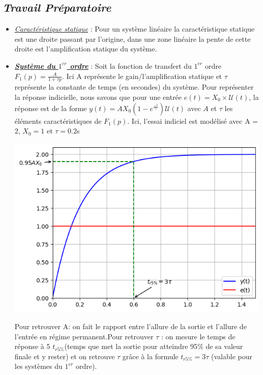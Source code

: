 \documentclass[12pt]{article}
\begin{document}
    \subsection{\itshape Travail Préparatoire}
\begin{itemize}
    

    \item  \underline{\itshape Caractéristique statique} : Pour un système linéaire la caractéristique statique est une
    droite passant par l'origine, dans une zone linéaire la pente de cette droite est
    l'amplification statique du système.

    \item \underline{\bf \itshape Système du $1^{er}$ ordre} : Soit la fonction de transfert du $1^{er}$ ordre $F_1(p) = \frac{A}{1 + \tau p }$. Ici A représente le gain/l'amplification statique et $\tau$ représente la constante de temps (en secondes) du système.
    Pour représenter la réponse indicielle, nous savons que pour une entrée $e(t) = X_0\times\mathcal{U}(t)$, la réponse est de la forme $y(t) = AX_0(1-e^{\frac{-t}{\tau}})\mathcal{U}(t)$ avec $A$ et $\tau$ les éléments caractéristiques de $F_1(p)$.
    Ici, l'essai indiciel est modélisé avec A = 2, $X_0 = 1$ et $\tau = 0.2$s
    \begin{center}
        \includegraphics{TP1/Syst_1/Reponse_indicielle_prem_ordre.png}
    \end{center}
    Pour retrouver A: on fait le rapport entre l'allure de la sortie et l'allure de l'entrée en régime permanent.Pour retrouver $\tau$ : on mesure le temps de réponse à 5 $t_{r5\%}$(temps que met la sortie pour atteindre 95$\%$ 
    de sa valeur finale et y rester) et on retrouve $\tau$ grâce à la formule $t_{r5\%} = 3\tau$ (valable pour les systèmes du $1^{er}$ ordre).


\end{itemize}
\end{document}
